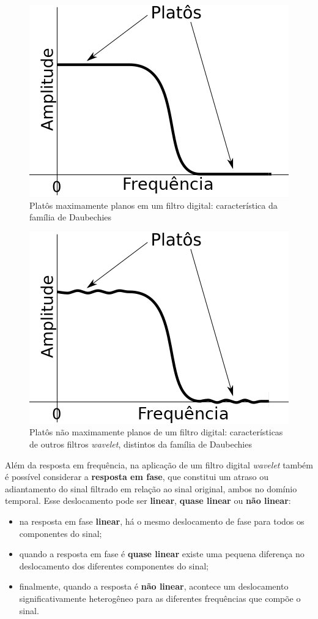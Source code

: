 			\begin{figure}[h]
				\centering
				\includegraphics[width=0.3\linewidth]{images/daubechies}
				\caption{Platôs maximamente planos em um filtro digital: característica da família de Daubechies}
				\label{fig:daubechies}
			\end{figure}

			\begin{figure}[h]
				\centering
				\includegraphics[width=0.3\linewidth]{images/noMaximallyFlat}
				\caption{Platôs não maximamente planos de um filtro digital: características de outros filtros \textit{wavelet}, distintos da família de Daubechies}
				\label{fig:nomaximallyflat}
			\end{figure}
		
			\par Além da resposta em frequência, na aplicação de um filtro digital \textit{wavelet} também é possível considerar a \textbf{resposta em fase}, que constitui um atraso ou adiantamento do sinal filtrado em relação ao sinal original, ambos no domínio temporal. Esse deslocamento pode ser \textbf{linear}, \textbf{quase linear} ou \textbf{não linear}: 
			
			\begin{itemize}
				\item na resposta em fase \textbf{linear}, há o mesmo deslocamento de fase para todos os componentes do sinal;
				\item quando a resposta em fase é \textbf{quase linear} existe uma pequena diferença no deslocamento dos diferentes componentes do sinal;
				\item finalmente, quando a resposta é \textbf{não linear}, acontece um deslocamento significativamente heterogêneo para as diferentes frequências que compõe o sinal.
				\end{itemize}
			
